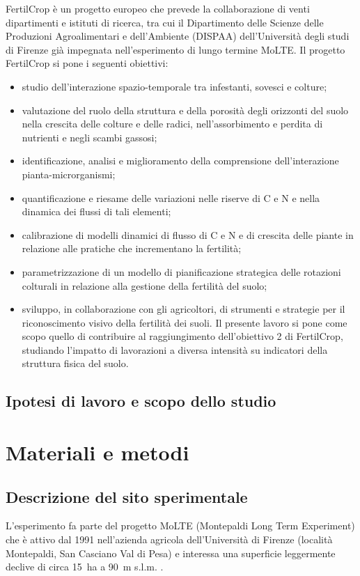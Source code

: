 \documentclass[11pt, a4paper, openright, titlepage, final, language = italian]{book}
\begin{document}
FertilCrop è un progetto europeo che prevede la collaborazione di
venti dipartimenti e istituti di ricerca, tra cui il Dipartimento
delle Scienze delle Produzioni Agroalimentari e dell'Ambiente (DISPAA)
dell'Universit\`a degli studi di Firenze gi\`a impegnata
nell’esperimento di lungo termine MoLTE.  Il progetto FertilCrop si
pone i seguenti obiettivi:
\begin{itemize}
\item studio dell’interazione spazio-temporale tra infestanti, sovesci
  e colture;
\item valutazione del ruolo della struttura e della porosit\`a degli
  orizzonti del suolo nella crescita delle colture e delle radici,
  nell’assorbimento e perdita di nutrienti e negli scambi gassosi;
\item identificazione, analisi e miglioramento della comprensione
  dell’interazione pianta-microrganismi;
\item quantificazione e riesame delle variazioni nelle riserve di C e
  N e nella dinamica dei flussi di tali elementi;
\item calibrazione di modelli dinamici di flusso di C e N e di
  crescita delle piante in relazione alle pratiche che incrementano la
  fertilit\`a;
\item parametrizzazione di un modello di pianificazione strategica
  delle rotazioni colturali in relazione alla gestione della fertilit\`a
  del suolo;
\item sviluppo, in collaborazione con gli agricoltori, di strumenti e
  strategie per il riconoscimento visivo della fertilit\`a dei suoli.
  Il presente lavoro si pone come scopo quello di contribuire al
  raggiungimento dell’obiettivo 2 di FertilCrop, studiando l’impatto
  di lavorazioni a diversa intensit\`a su indicatori della struttura
  fisica del suolo.
\end{itemize}
\section{Ipotesi di lavoro e scopo dello studio}

\chapter{Materiali e metodi}
\section{Descrizione del sito sperimentale}
L'esperimento fa parte del progetto MoLTE (Montepaldi Long Term
Experiment) che è attivo dal 1991 nell’azienda agricola
dell’Universit\`a di Firenze (localit\`a Montepaldi, San Casciano Val di
Pesa) e interessa una superficie leggermente declive di circa
\SI{15}{\hectare} a \SI{90}{\meter} s.l.m. .
\end{document}
